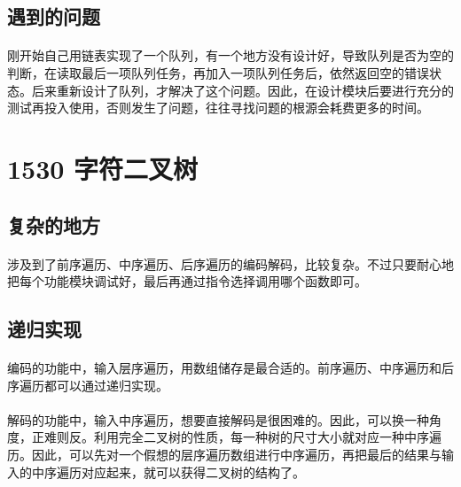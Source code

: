\documentclass[UTF-8, 12pt]{ctexart}
\begin{document}
    \subsection{遇到的问题}
    \paragraph{}
    刚开始自己用链表实现了一个队列，有一个地方没有设计好，导致队列是否为空的判断，在读取最后一项队列任务，再加入一项队列任务后，依然返回空的错误状态。后来重新设计了队列，才解决了这个问题。因此，在设计模块后要进行充分的测试再投入使用，否则发生了问题，往往寻找问题的根源会耗费更多的时间。
    
\section{1530 字符二叉树}
	\subsection{复杂的地方}
	\paragraph{}
		涉及到了前序遍历、中序遍历、后序遍历的编码解码，比较复杂。不过只要耐心地把每个功能模块调试好，最后再通过指令选择调用哪个函数即可。
	\subsection{递归实现}
	\paragraph{}
		编码的功能中，输入层序遍历，用数组储存是最合适的。前序遍历、中序遍历和后序遍历都可以通过递归实现。
	\paragraph{}
		解码的功能中，输入中序遍历，想要直接解码是很困难的。因此，可以换一种角度，正难则反。利用完全二叉树的性质，每一种树的尺寸大小就对应一种中序遍历。因此，可以先对一个假想的层序遍历数组进行中序遍历，再把最后的结果与输入的中序遍历对应起来，就可以获得二叉树的结构了。

    
\end{document}
